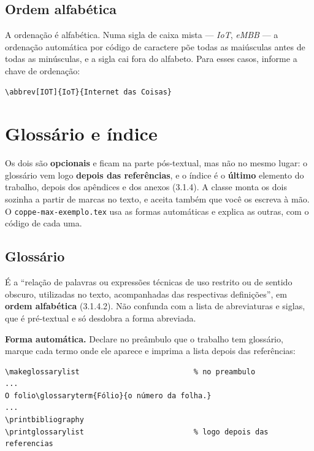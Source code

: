 \documentclass[dsc]{ufrj}
\begin{document}

  \section{Ordem alfabética}

  A ordenação é alfabética. Numa sigla de caixa mista --- \emph{IoT},
  \emph{eMBB} --- a ordenação automática por código de caractere põe todas as
  maiúsculas antes de todas as minúsculas, e a sigla cai fora do alfabeto. Para
  esses casos, informe a chave de ordenação:

\begin{verbatim}
\abbrev[IOT]{IoT}{Internet das Coisas}
\end{verbatim}

  \chapter{Glossário e índice}\label{cap:glossarioindice}

  Os dois são \textbf{opcionais} e ficam na parte pós-textual, mas não no mesmo
  lugar: o glossário vem logo \textbf{depois das referências}, e o índice é o
  \textbf{último} elemento do trabalho, depois dos apêndices e dos anexos
  (3.1.4). A classe monta os dois sozinha a partir de marcas no texto, e aceita
  também que você os escreva à mão. O \texttt{coppe-max-exemplo.tex} usa as formas
  automáticas e explica as outras, com o código de cada uma.

  \section{Glossário}

  É a ``relação de palavras ou expressões técnicas de uso restrito ou de
  sentido obscuro, utilizadas no texto, acompanhadas das respectivas
  definições'', em \textbf{ordem alfabética} (3.1.4.2). Não confunda com a
  lista de abreviaturas e siglas, que é pré-textual e só desdobra a forma
  abreviada.

  \textbf{Forma automática.} Declare no preâmbulo que o trabalho tem glossário,
  marque cada termo onde ele aparece e imprima a lista depois das referências:

\begin{verbatim}
\makeglossarylist                          % no preambulo
...
O folio\glossaryterm{Fólio}{o número da folha.}
...
\printbibliography
\printglossarylist                         % logo depois das referencias
\end{verbatim}
\end{document}
